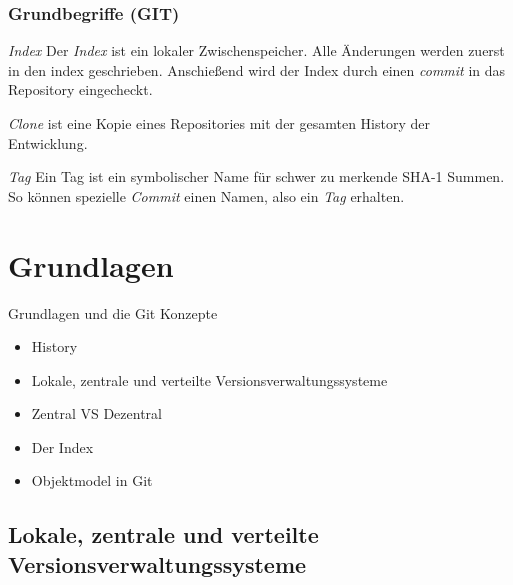 \documentclass{beamer}
\begin{document}
\begin{frame}\frametitle{Grundbegriffe (GIT)}
\begin{block}{\textit{Index}}
Der \textit{Index} ist ein lokaler Zwischenspeicher. Alle Änderungen werden zuerst in den index geschrieben. Anschießend wird der Index durch einen \textit{commit} in das Repository eingecheckt. 
\end{block}
\begin{block}{\textit{Clone}}
ist eine Kopie eines Repositories mit der gesamten History der Entwicklung.
\end{block}
\begin{block}{\textit{Tag}}
Ein Tag ist ein symbolischer Name für schwer zu merkende SHA-1 Summen. So können spezielle \textit{Commit} einen Namen, also ein \textit{Tag} erhalten. 
\end{block}
\end{frame}

\section{Grundlagen}
\begin{frame}[c]
\begin{center}
\begin{Huge}
Grundlagen und die Git Konzepte
\end{Huge}
\begin{itemize}
\vspace{1.5cm}
\item History
\item Lokale, zentrale und verteilte Versionsverwaltungssysteme
\item Zentral VS Dezentral
\item Der Index
\item Objektmodel in Git
\end{itemize}
\end{center}
\end{frame}


\subsection{Lokale, zentrale und verteilte Versionsverwaltungssysteme} 
\end{document}
